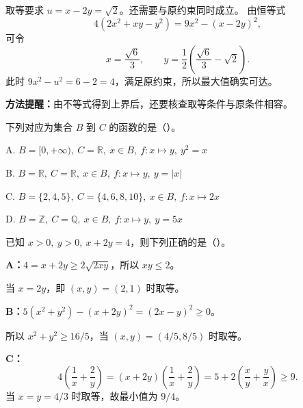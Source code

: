 \begin{frame}
取等要求 $u=x-2y=\sqrt2$。还需要与原约束同时成立。
由恒等式
\[4(2x^2+xy-y^2)=9x^2-(x-2y)^2,\]
可令
\[x=\frac{\sqrt6}{3},\qquad y=\frac12\left(\frac{\sqrt6}{3}-\sqrt2\right).\]
此时 $9x^2-u^2=6-2=4$，满足原约束，所以最大值确实可达。
\par\vspace{3mm}
\textbf{方法提醒：}由不等式得到上界后，还要核查取等条件与原条件相容。
\end{frame}

\begin{frame}
下列对应为集合 $B$ 到 $C$ 的函数的是（\quad）。
\par\vspace{3mm}
A. $B=[0,+\infty),\ C=\mathbb R,\ x\in B,\ f:x\mapsto y,\ y^2=x$\par\vspace{2mm}
B. $B=\mathbb R,\ C=\mathbb R,\ x\in B,\ f:x\mapsto y,\ y=|x|$\par\vspace{2mm}
C. $B=\{2,4,5\},\ C=\{4,6,8,10\},\ x\in B,\ f:x\mapsto2x$\par\vspace{2mm}
D. $B=\mathbb Z,\ C=\mathbb Q,\ x\in B,\ f:x\mapsto y,\ y=5x$
\pause
{}
\end{frame}

\begin{frame}
已知 $x>0,\ y>0,\ x+2y=4$，则下列正确的是（\quad）。
\pause
{}
\end{frame}

\begin{frame}
\textbf{A：}$4=x+2y\ge2\sqrt{2xy}$，所以 $xy\le2$。\par
当 $x=2y$，即 $(x,y)=(2,1)$ 时取等。
\par\vspace{3mm}
\textbf{B：}$5(x^2+y^2)-(x+2y)^2=(2x-y)^2\ge0$。\par
所以 $x^2+y^2\ge16/5$，当 $(x,y)=(4/5,8/5)$ 时取等。
\par\vspace{3mm}
\textbf{C：}
\[4\left(\frac1x+\frac2y\right)=(x+2y)\left(\frac1x+\frac2y\right)
=5+2\left(\frac xy+\frac yx\right)\ge9.\]
当 $x=y=4/3$ 时取等，故最小值为 $9/4$。
\end{frame}

